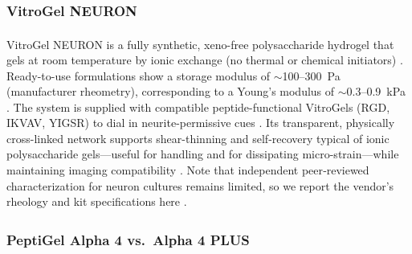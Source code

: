\documentclass[referee,pdflatex, sn-vancouver-num]{sn-jnl}%
\theoremstyle{thmstyleone}%
\theoremstyle{thmstyletwo}%
\theoremstyle{thmstylethree}%
\begin{document}
\subsubsection{VitroGel\texorpdfstring{\textsuperscript{\textregistered}}{ (R)} NEURON} 
VitroGel\textsuperscript{\textregistered} NEURON is a fully synthetic, xeno-free polysaccharide hydrogel that gels at room temperature by ionic exchange (no thermal or chemical initiators) \cite{TheWell_GelationWorks,TheWell_NeuronPage}. Ready-to-use formulations show a storage modulus of \(\sim\)100–300~Pa (manufacturer rheometry), corresponding to a Young’s modulus of \(\sim\)0.3–0.9~kPa \citep{TheWell_ReadyToUseModulus}. The system is supplied with compatible peptide-functional VitroGels (RGD, IKVAV, YIGSR) to dial in neurite-permissive cues \citep{TheWell_RGD,TheWell_IKVAV,TheWell_YIGSR}. Its transparent, physically cross-linked network supports shear-thinning and self-recovery typical of ionic polysaccharide gels—useful for handling and for dissipating micro-strain—while maintaining imaging compatibility \citep{TheWell_NeuronPage,Karvinen2022SelfHealing,Nishimura2023SelfHealing}.
Note that independent peer‑reviewed characterization for neuron cultures remains limited, so we report the vendor’s rheology and kit specifications here \cite{TheWell_RGD,TheWell_IKVAV,TheWell_YIGSR,TheWell_NeuronPage, TheWell_ReadyToUseModulus, TheWell_GelationWorks}.


\subsubsection{PeptiGel\texorpdfstring{\textsuperscript{\textregistered}}{ (R)} Alpha 4 vs.\ Alpha 4 PLUS}
\end{document}
